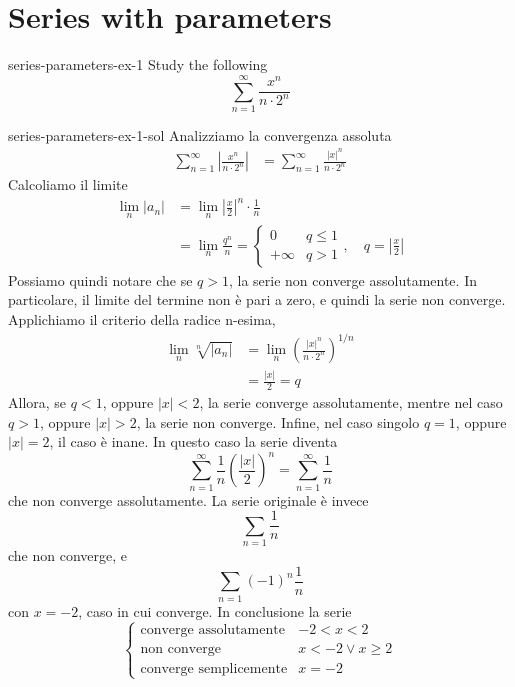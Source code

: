 \documentclass[preview]{standalone}
\begin{document}
\genpage

\section{Series with parameters}


\begin{snippetexercise}{series-parameters-ex-1}{}
    Study the following \series
    \[
        \sum_{n=1}^\infty \frac{x^n}{n\cdot 2^n}
    \]
\end{snippetexercise}

\begin{snippetsolution}{series-parameters-ex-1-sol}{}
    Analizziamo la convergenza assoluta
    \begin{align*}
        \sum_{n=1}^\infty \left|\frac{x^n}{n\cdot 2^n}\right|
        &= \sum_{n=1}^\infty \frac{{|x|}^n}{n\cdot 2^n}
    \end{align*}
    Calcoliamo il limite
    \begin{align*}
        \lim_n |a_n| &= \lim_n {\left|\frac{x}{2}\right|}^n \cdot \frac{1}{n}
        \\
        &= \lim_n \frac{q^n}{n} = \begin{cases}
            0 & q \leq 1 \\
            +\infty & q > 1
        \end{cases}, \quad q = \left|\frac{x}{2}\right|
    \end{align*}
    Possiamo quindi notare che se \(q>1\), la serie non converge assolutamente.
    In particolare, il limite del termine non è pari a zero, e quindi la serie non converge.
    Applichiamo il criterio della radice n-esima,
    \begin{align*}
        \lim_n \sqrt[n]{|a_n|} &= \lim_n {\left(
            \frac{{|x|}^n}{n\cdot 2^n}
        \right)}^{1/n} \\
        &= \frac{|x|}{2} = q
    \end{align*}
    Allora, se \(q<1\), oppure \(|x| < 2\), la serie converge assolutamente,
    mentre nel caso \(q>1\), oppure \(|x| > 2\), la serie non converge.
    Infine, nel caso singolo \(q=1\), oppure \(|x| = 2\),
    il caso è inane. In questo caso la serie diventa
    \[
        \sum_{n=1}^\infty \frac{1}{n} {\left(\frac{|x|}{2}\right)}^n
        = \sum_{n=1}^\infty \frac{1}{n}
    \]
    che non converge assolutamente.
    La serie originale è invece
    \[
        \sum_{n=1} \frac{1}{n}
    \]
    che non converge, e
    \[
        \sum_{n=1} {(-1)}^n \frac{1}{n}
    \]
    con \(x=-2\), caso in cui converge.
    In conclusione la serie
    \[
        \begin{cases}
            \text{converge assolutamente} & -2 < x < 2 \\
            \text{non converge} & x < -2 \lor x \geq 2 \\
            \text{converge semplicemente} & x = -2
        \end{cases}
    \]
\end{snippetsolution}
\end{document}
